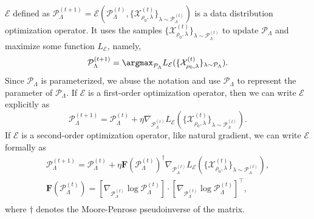 $\mathcal{E}$ defined as $\mathcal{P}_{\Lambda}^{(t+1)}  
= \mathcal{E}(\mathcal{P}_{\Lambda}^{(t)}, \{\mathcal{X}^{(t)}_{\rho_0, \lambda}\}_{\lambda \sim \mathcal{P}^{(t)}_{\Lambda}} )$ 
is a data distribution optimization operator.
It uses the samples $\{\mathcal{X}^{(t)}_{\rho_0, \lambda}\}_{\lambda \sim \mathcal{P}^{(t)}_{\Lambda}}$ to update $\mathcal{P}_{\Lambda}$ and maximize some function $L_{\mathcal{E}}$, namely,
\begin{equation*}
    \mathcal{P}_{\Lambda}^{(t+1)} = \argmax_{\mathcal{P}_{\Lambda}} L_{\mathcal{E}} (\{\mathcal{X}^{(t)}_{\rho_0, \lambda}\}_{\lambda \sim \mathcal{P}_{\Lambda}}).
\end{equation*}
Since $\mathcal{P}_{\Lambda}$ is parameterized,  we abuse the notation and use $\mathcal{P}_{\Lambda}$ to represent the parameter of $\mathcal{P}_{\Lambda}$.
If $\mathcal{E}$ is a first-order optimization operator, then we can write $\mathcal{E}$ explicitly as
\begin{equation*}
    \mathcal{P}_{\Lambda}^{(t+1)} = \mathcal{P}_{\Lambda}^{(t)} + \eta \nabla_{\mathcal{P}_{\Lambda}^{(t)}} L_{\mathcal{E}} (\{\mathcal{X}^{(t)}_{\rho_0, \lambda}\}_{\lambda \sim \mathcal{P}^{(t)}_{\Lambda}}).
\end{equation*}
If $\mathcal{E}$ is a second-order optimization operator, like natural gradient, we can write $\mathcal{E}$ formally as
    \begin{gather*}
        \mathcal{P}_{\Lambda}^{(t+1)} = \mathcal{P}_{\Lambda}^{(t)} + \eta
        \textbf{F}(\mathcal{P}_{\Lambda}^{(t)})^\dagger
        \nabla_{\mathcal{P}_{\Lambda}^{(t)}} L_{\mathcal{E}} (\{\mathcal{X}^{(t)}_{\rho_0, \lambda}\}_{\lambda \sim \mathcal{P}^{(t)}_{\Lambda}}), \\
        \textbf{F}(\mathcal{P}_{\Lambda}^{(t)}) = \left[\nabla_{\mathcal{P}_{\Lambda}^{(t)}} \log \mathcal{P}_{\Lambda}^{(t)} \right]
        \cdot
        \left[\nabla_{\mathcal{P}_{\Lambda}^{(t)}} \log \mathcal{P}_{\Lambda}^{(t)} \right]^\top, \\
    \end{gather*}
where $\dagger$ denotes the Moore-Penrose pseudoinverse of the matrix.

